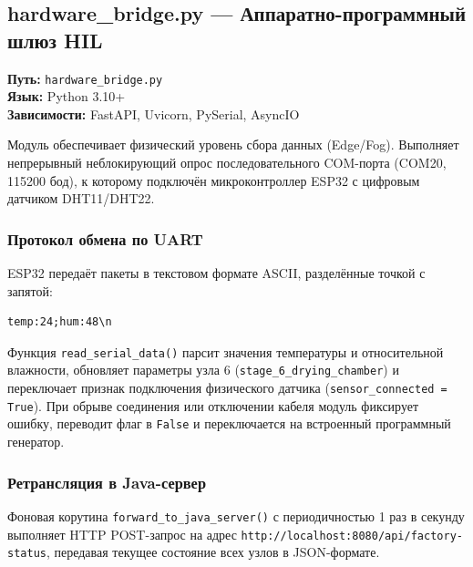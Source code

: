 \documentclass[14pt, a4paper]{extarticle}
\begin{document}
\subsection{hardware\_bridge.py --- Аппаратно-программный шлюз HIL}

\textbf{Путь:} \texttt{hardware\_bridge.py}\\
\textbf{Язык:} Python 3.10+\\
\textbf{Зависимости:} FastAPI, Uvicorn, PySerial, AsyncIO

Модуль обеспечивает физический уровень сбора данных (Edge/Fog). Выполняет непрерывный неблокирующий опрос последовательного COM-порта (COM20, 115200 бод), к которому подключён микроконтроллер ESP32 с цифровым датчиком DHT11/DHT22.

\subsubsection{Протокол обмена по UART}
ESP32 передаёт пакеты в текстовом формате ASCII, разделённые точкой с запятой:
\begin{verbatim}
temp:24;hum:48\n
\end{verbatim}
Функция \texttt{read\_serial\_data()} парсит значения температуры и относительной влажности, обновляет параметры узла 6 (\texttt{stage\_6\_drying\_chamber}) и переключает признак подключения физического датчика (\texttt{sensor\_connected = True}). При обрыве соединения или отключении кабеля модуль фиксирует ошибку, переводит флаг в \texttt{False} и переключается на встроенный программный генератор.

\subsubsection{Ретрансляция в Java-сервер}
Фоновая корутина \texttt{forward\_to\_java\_server()} с периодичностью 1 раз в секунду выполняет HTTP POST-запрос на адрес \texttt{http://localhost:8080/api/factory-status}, передавая текущее состояние всех узлов в JSON-формате.
\end{document}
